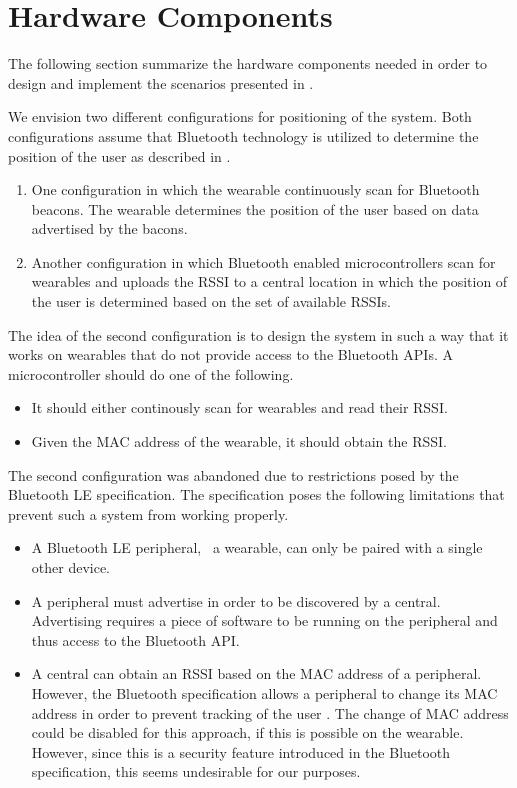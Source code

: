 \section{Hardware Components}
\label{sec:analysis:system-components}

The following section summarize the hardware components needed in order to design and implement the scenarios presented in .

We envision two different configurations for positioning of the system. Both configurations assume that Bluetooth technology is utilized to determine the position of the user as described in .

\begin{enumerate}
\item One configuration in which the wearable continuously scan for Bluetooth beacons. The wearable determines the position of the user based on data advertised by the bacons.
\item Another configuration in which Bluetooth enabled microcontrollers scan for wearables and uploads the RSSI to a central location in which the position of the user is determined based on the set of available RSSIs.
\end{enumerate}

The idea of the second configuration is to design the system in such a way that it works on wearables that do not provide access to the Bluetooth APIs. A microcontroller should do one of the following.

\begin{itemize}
\item It should either continously scan for wearables and read their RSSI.
\item Given the MAC address of the wearable, it should obtain the RSSI.
\end{itemize}

The second configuration was abandoned due to restrictions posed by the Bluetooth LE specification. The specification poses the following limitations that prevent such a system from working properly.

\begin{itemize}
\item A Bluetooth LE peripheral, \eg~a wearable, can only be paired with a single other device.
\item A peripheral must advertise in order to be discovered by a central. Advertising requires a piece of software to be running on the peripheral and thus access to the Bluetooth API.
\item A central can obtain an RSSI based on the MAC address of a peripheral. However, the Bluetooth specification allows a peripheral to change its MAC address in order to prevent tracking of the user \cite[p.~91]{Bluetooth2010Bluetooth_vol_1}. The change of MAC address could be disabled for this approach, if this is possible on the wearable. However, since this is a security feature introduced in the Bluetooth specification, this seems undesirable for our purposes.
\end{itemize}

